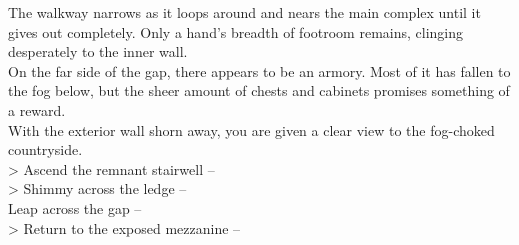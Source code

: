 



The walkway narrows as it loops around and nears the main complex until it gives out completely. Only a hand’s breadth of footroom remains, clinging desperately to the inner wall.\\

On the far side of the gap, there appears to be an armory. Most of it has fallen to the fog below, but the sheer amount of chests and cabinets promises something of a reward.\\

With the exterior wall shorn away, you are given a clear view to the fog-choked countryside.\\

> Ascend the remnant stairwell -- \\
> Shimmy across the ledge -- \\
 Leap across the gap -- \\
> Return to the exposed mezzanine -- 